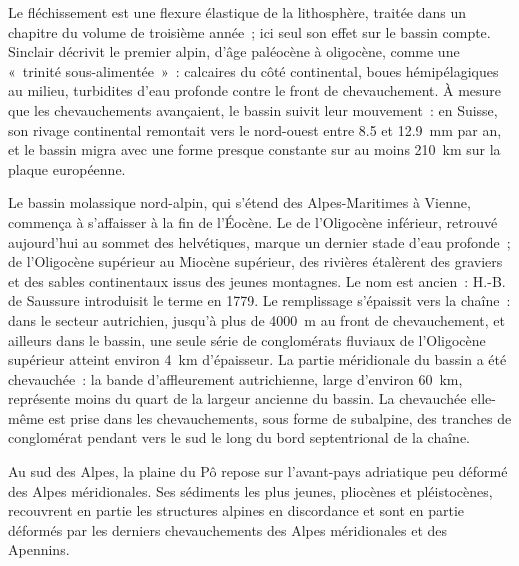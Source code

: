 Le fléchissement est une flexure élastique de la lithosphère, traitée dans un chapitre du volume de
troisième année~; ici seul son effet sur le bassin compte. Sinclair décrivit le premier  alpin, d'âge paléocène à oligocène,
comme une «~trinité sous-alimentée~»~: calcaires du côté continental, boues hémipélagiques au
milieu, turbidites d'eau profonde contre le front de chevauchement. À mesure que les chevauchements avançaient, le bassin
suivit leur mouvement~: en Suisse, son rivage continental remontait vers le nord-ouest entre 8.5
et \qty{12.9}{mm} par an, et le bassin migra avec une forme presque constante sur au moins
\qty{210}{km} sur la plaque européenne.

Le bassin molassique nord-alpin, qui s'étend des Alpes-Maritimes à Vienne, commença à s'affaisser à la
fin de l'Éocène. Le  de l'Oligocène inférieur, retrouvé aujourd'hui au sommet des  helvétiques,
marque un dernier stade d'eau profonde~; de l'Oligocène supérieur au Miocène supérieur, des rivières
étalèrent des graviers et des sables continentaux issus des jeunes montagnes. Le nom est ancien~: H.-B. de Saussure
introduisit le terme \emph{} en 1779. Le remplissage s'épaissit vers la chaîne~: dans le
secteur autrichien, jusqu'à plus de \qty{4000}{m} au front de chevauchement, et ailleurs dans le bassin, une seule
série de conglomérats fluviaux de l'Oligocène supérieur atteint environ \qty{4}{km} d'épaisseur. La partie
méridionale du bassin a été chevauchée~: la bande d'affleurement autrichienne, large d'environ \qty{60}{km}, représente moins
du quart de la largeur ancienne du bassin. La  chevauchée elle-même est prise dans les
chevauchements, sous forme de  subalpine, des tranches de conglomérat pendant vers le sud le long du
bord septentrional de la chaîne.

Au sud des Alpes, la plaine du Pô repose sur l'avant-pays adriatique peu déformé des Alpes
méridionales. Ses sédiments les plus jeunes, pliocènes et pléistocènes, recouvrent en partie les structures alpines
en discordance et sont en partie déformés par les derniers chevauchements des Alpes méridionales
et des Apennins.

